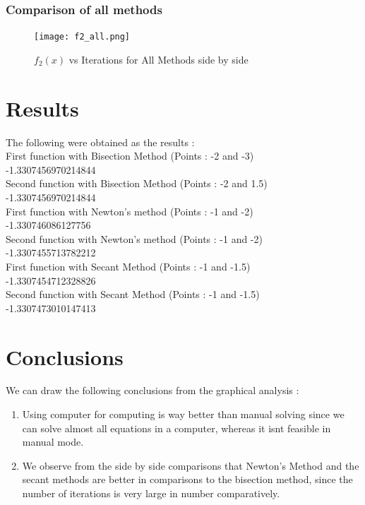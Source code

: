 \documentclass[12pt]{article}
\begin{document}
\subsubsection{Comparison of all methods}
\begin{figure}[H]
    \centering
    \texttt{[image: f2\_all.png]}
    \caption{$f_2(x)$ vs Iterations for All Methods side by side}
\end{figure}


\section{Results}
The following were obtained as the results :\\
First function with Bisection Method (Points : -2 and -3)\\
-1.3307456970214844\\
Second function with Bisection Method (Points : -2 and 1.5)\\
-1.3307456970214844\\
First function with Newton's method (Points : -1 and -2)\\
-1.330746086127756\\
Second function with Newton's method (Points : -1 and -2)\\
-1.3307455713782212\\
First function with Secant Method (Points : -1 and -1.5)\\
-1.3307454712328826\\
Second function with Secant Method (Points : -1 and -1.5)\\
-1.3307473010147413\\


\newpage
\section{Conclusions}
We can draw the following conclusions from the graphical analysis :
\begin{enumerate}
    \item Using computer for computing is way better than manual solving since we can solve almost all equations in a computer, whereas it isnt feasible in manual mode.
    \item We observe from the side by side comparisons that Newton's Method and the secant methods are better in comparisons to the bisection method, since the number of iterations is very large in number comparatively.
\end{enumerate}
\end{document}
